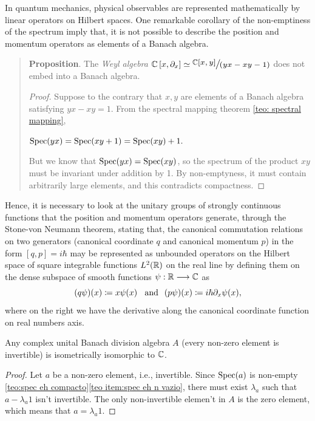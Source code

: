 \begin{observacao}
In quantum mechanics, physical observables are represented mathematically by linear operators on Hilbert spaces. One remarkable corollary of the non-emptiness of the spectrum imply that, it is not possible to describe the position and momentum operators as elements of a Banach algebra. 
\begin{quote}
    \textbf{Proposition}. The \textit{Weyl algebra} $\mathbb{C}\left[x, \partial_{x}\right] \simeq \mfrac{\mathbb{C}[x, y]}{(y x-x y-1)}$ does not embed into a Banach algebra.
    \vspace{-0.4cm}
    \begin{proof}
    Suppose to the contrary that $x, y$ are elements of a Banach algebra satisfying $y x-x y=1$. From the spectral mapping theorem \ref{teo: spectral mapping},
    \begin{center}
        $\operatorname{Spec}(y x)=\operatorname{Spec}(x y+1)=\operatorname{Spec}(x y)+1.$
    \end{center}
    But we know that $\operatorname{Spec}(y x)=\operatorname{Spec}(x y)$, so the spectrum of the product $xy$ must be invariant under addition by 1. By non-emptyness, it must contain arbitrarily large elements, and this contradicts compactness.
    \end{proof}
\end{quote}
Hence, it is necessary to look at the unitary groups of strongly continuous functions that the position and momentum operators generate, through the Stone-von Neumann theorem, stating that, the canonical commutation relations on two generators (canonical coordinate $q$ and canonical momentum $p$) in the form $[q,p]=i\hbar$ may be represented as unbounded operators on the Hilbert space of square integrable functions $L^2(\operatorname{\mathbb{R}})$ on the real line by defining them on the dense subspace of smooth functions $\psi:\operatorname{\mathbb{R}}\longrightarrow \operatorname{\mathbb{C}}$ as
\begin{equation*}
    (q\psi)(x)\coloneqq x\psi(x) \hspace{0.25cm}\operatorname{and}\hspace{0.25cm} (p\psi)(x)\coloneqq i\hbar \partial_x\psi(x),
\end{equation*}
where on the right we have the derivative along the canonical coordinate function on real numbers axis.
\end{observacao}

\begin{corolario}
\label{teo: Gelfand Mazur}
Any complex unital Banach division algebra $A$ (every non-zero element is invertible) is isometrically isomorphic to $\operatorname{\mathbb{C}}$.
\end{corolario}
\begin{proof}
Let $a$ be a non-zero element, i.e., invertible. Since $\operatorname{Spec}(a)$ is non-empty \ref{teo:spec eh compacto}\ref{teo item:spec eh n vazio}, there must exist $\lambda_a$ such that $a-\lambda_a1$ isn't invertible. The only non-invertible elemen't in $A$ is the zero element, which means that $a = \lambda_a1$.
\end{proof}


